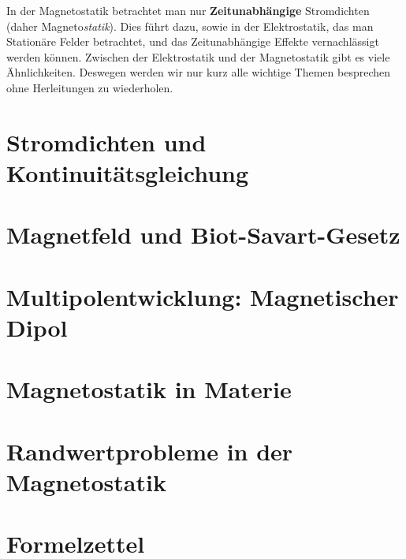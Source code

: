 In der Magnetostatik betrachtet man nur \textbf{Zeitunabhängige} Stromdichten (daher Magneto\textit{statik}). Dies führt dazu, sowie in der
Elektrostatik, das man Stationäre Felder betrachtet, und das Zeitunabhängige
Effekte vernachlässigt werden können. Zwischen der Elektrostatik und
der Magnetostatik gibt es viele Ähnlichkeiten. Deswegen werden wir nur
kurz alle wichtige Themen besprechen ohne Herleitungen zu wiederholen.

\section{Stromdichten und Kontinuitätsgleichung}%
\label{sec:stromdichten}


\newpage
\section{Magnetfeld und Biot-Savart-Gesetz}%
\label{sec:magnetfeld}


\newpage
\section{Multipolentwicklung: Magnetischer Dipol}%


\newpage
\section{Magnetostatik in Materie}%


\newpage
\section{Randwertprobleme in der Magnetostatik}%


\newpage
\section{Formelzettel}%
